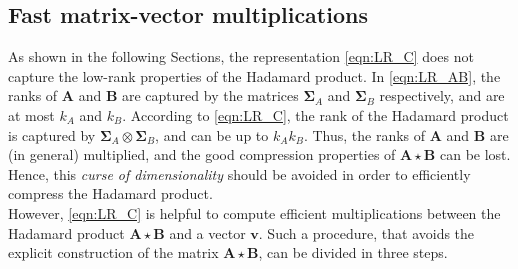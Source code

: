 \documentclass[10pt,titlepage]{article}
\numberwithin{equation}{section}
\numberwithin{figure}{section}
\newcommand{\hadamard}[2]{\mathbf{#1} \star \mathbf{#2}}
\begin{document}
\subsection{Fast matrix-vector multiplications} \label{sec:matvec_hadamard}
As shown in the following Sections, the representation \eqref{eqn:LR_C} does not capture the low-rank properties of the Hadamard product. In \eqref{eqn:LR_AB}, the ranks of $\mathbf{A}$ and $\mathbf{B}$ are captured by the matrices $\mathbf{\Sigma}_A$ and $\mathbf{\Sigma}_B$ respectively, and are at most $k_A$ and $k_B$. According to \eqref{eqn:LR_C}, the rank of the Hadamard product is captured by $\mathbf{\Sigma}_A \otimes \mathbf{\Sigma}_B$, and can be up to $k_A k_B$. Thus, the ranks of $\mathbf{A}$ and $\mathbf{B}$ are (in general) multiplied, and the good compression properties of $\hadamard{A}{B}$ can be lost. Hence, this \textit{curse of dimensionality} should be avoided in order to efficiently compress the Hadamard product. 
\\
However, \eqref{eqn:LR_C} is helpful to compute efficient multiplications between the Hadamard product $\hadamard{A}{B}$ and a vector $\mathbf{v}$. Such a procedure, that avoids the explicit construction of the matrix $\hadamard{A}{B}$, can be divided in three steps.
\end{document}
